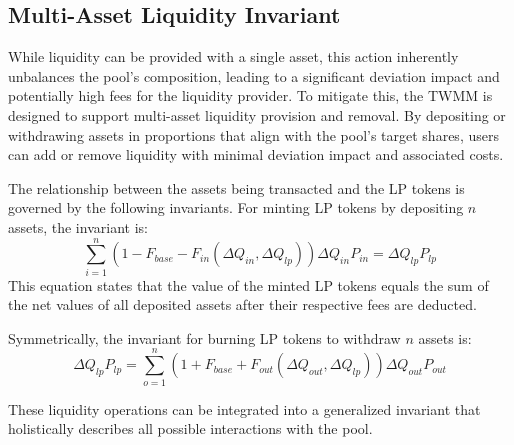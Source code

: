 \subsection{Multi-Asset Liquidity Invariant}
While liquidity can be provided with a single asset, this action inherently unbalances the pool's composition, leading to a significant deviation impact and potentially high fees for the liquidity provider. To mitigate this, the TWMM is designed to support multi-asset liquidity provision and removal. By depositing or withdrawing assets in proportions that align with the pool's target shares, users can add or remove liquidity with minimal deviation impact and associated costs.

The relationship between the assets being transacted and the LP tokens is governed by the following invariants. For minting LP tokens by depositing $n$ assets, the invariant is:
\begin{equation}
	\label{eq:invariant_lp_mint}
	\sum_{i=1}^{n} 
	(1 -  F_{base} - F_{in}(\Delta Q_{in}, \Delta Q_{lp})) \Delta Q_{in} P_{in}  
	= 
	\Delta Q_{lp} P_{lp} 
\end{equation}
This equation states that the value of the minted LP tokens equals the sum of the net values of all deposited assets after their respective fees are deducted.

Symmetrically, the invariant for burning LP tokens to withdraw $n$ assets is:
\begin{equation}
	\label{eq:invariant_lp_mint}
	\Delta Q_{lp} P_{lp}  =
	\sum_{o=1}^{n} 
	(1 + F_{base} + F_{out}(\Delta Q_{out}, \Delta Q_{lp})) \Delta Q_{out} P_{out}  
\end{equation}

These liquidity operations can be integrated into a generalized invariant that holistically describes all possible interactions with the pool.